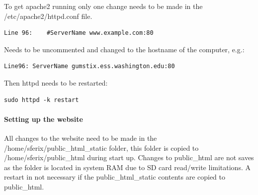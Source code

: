 To get apache2 running only one change needs to be made in the /etc/apache2/httpd.conf file.

\begin{verbatim}
Line 96:	#ServerName www.example.com:80
\end{verbatim}

Needs to be uncommented and changed to the hostname of the computer, e.g.:

\begin{verbatim}
Line96:	ServerName gumstix.ess.washington.edu:80
\end{verbatim}

Then httpd needs to be restarted:

\begin{verbatim}
sudo httpd -k restart
\end{verbatim}

\paragraph{Setting up the website}

All changes to the website need to be made in the /home/sferix/public\_html\_static folder, this folder is copied to /home/sferix/public\_html during start up. Changes to public\_html are not saves as the folder is located in system RAM due to SD card read/write limitations. A restart in not necessary if the public\_html\_static contents are copied to public\_html.



